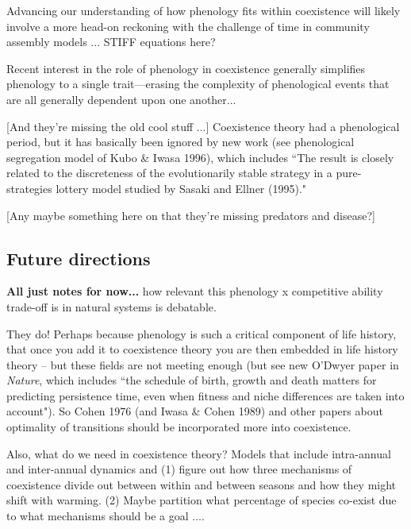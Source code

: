 \documentclass[11pt]{article}
\begin{document}
Advancing our understanding of how phenology fits within coexistence will likely involve a more head-on reckoning with the challenge of time in community assembly models ... STIFF equations here? 

Recent interest in the role of phenology in coexistence generally simplifies phenology to a single trait---erasing the complexity of phenological events that are all generally dependent upon one another... 

[And they're missing the old cool stuff ...] Coexistence theory had a phenological period, but it has basically been ignored by new work (see phenological segregation model of Kubo \& Iwasa 1996), which includes ``The result is closely related to the discreteness of the evolutionarily stable strategy in a pure-strategies lottery model studied by Sasaki and Ellner (1995)." 

[Any maybe something here on that they're missing predators and disease?]

\subsection*{Future directions}

{\bf All just notes for now...}
 how relevant this phenology x competitive ability  trade-off is in natural systems is debatable. 


They do! Perhaps because phenology is such a critical component of life history, that once you add it to coexistence theory you are then embedded in life history theory -- but these fields are not meeting enough (but see new O'Dwyer paper in \emph{Nature}, which includes ``the schedule of birth, growth and death matters for predicting persistence time, even when fitness and niche differences are taken into account"). So Cohen 1976 (and Iwasa \& Cohen 1989) and other papers about optimality of transitions should be incorporated more into coexistence. 

Also, what do we need in coexistence theory? Models that include intra-annual and inter-annual dynamics and (1) figure out how three mechanisms of coexistence divide out between within and between seasons and how they might shift with warming. (2) Maybe partition what percentage of species co-exist due to what mechanisms should be a goal .... 
\end{document}
